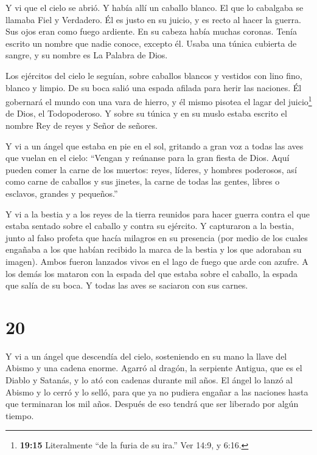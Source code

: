  Y vi que el cielo se abrió. Y había allí un caballo
blanco. El que lo cabalgaba se llamaba Fiel y Verdadero. Él es justo en
su juicio, y es recto al hacer la guerra.  Sus ojos eran
como fuego ardiente. En su cabeza había muchas coronas. Tenía escrito un
nombre que nadie conoce, excepto él.  Usaba una túnica
cubierta de sangre, y su nombre es La Palabra de Dios.

 Los ejércitos del cielo le seguían, sobre caballos blancos
y vestidos con lino fino, blanco y limpio.  De su boca
salió una espada afilada para herir las naciones. Él gobernará el mundo
con una vara de hierro, y él mismo pisotea el lagar del
juicio\footnote{\textbf{19:15} Literalmente ``de la furia de su ira.''
  Ver 14:9, y 6:16.} de Dios, el Todopoderoso.  Y sobre su
túnica y en su muslo estaba escrito el nombre Rey de reyes y Señor de
señores.

 Y vi a un ángel que estaba en pie en el sol, gritando a
gran voz a todas las aves que vuelan en el cielo: ``Vengan y reúnanse
para la gran fiesta de Dios.  Aquí pueden comer la carne de
los muertos: reyes, líderes, y hombres poderosos, así como carne de
caballos y sus jinetes, la carne de todas las gentes, libres o esclavos,
grandes y pequeños.''

 Y vi a la bestia y a los reyes de la tierra reunidos para
hacer guerra contra el que estaba sentado sobre el caballo y contra su
ejército.  Y capturaron a la bestia, junto al falso profeta
que hacía milagros en su presencia (por medio de los cuales engañaba a
los que habían recibido la marca de la bestia y los que adoraban su
imagen). Ambos fueron lanzados vivos en el lago de fuego que arde con
azufre.  A los demás los mataron con la espada del que
estaba sobre el caballo, la espada que salía de su boca. Y todas las
aves se saciaron con sus carnes.

\hypertarget{section-19}{%
\section{20}\label{section-19}}

 Y vi a un ángel que descendía del cielo, sosteniendo en su
mano la llave del Abismo y una cadena enorme.  Agarró al
dragón, la serpiente Antigua, que es el Diablo y Satanás, y lo ató con
cadenas durante mil años.  El ángel lo lanzó al Abismo y lo
cerró y lo selló, para que ya no pudiera engañar a las naciones hasta
que terminaran los mil años. Después de eso tendrá que ser liberado por
algún tiempo.

